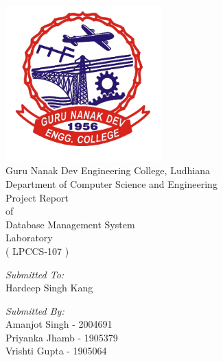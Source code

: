 \begin{titlepage}    
    \begin{center}
        \includegraphics[width=6cm]{figures/gneLogo.png}\\[0.5cm]
        \huge{ Guru Nanak Dev Engineering College, Ludhiana}\\[0.5cm]
        \LARGE{Department of Computer Science and Engineering}\\[2cm]
        \linespread{1.2}\huge {
            Project Report 
            \\of 
            \\Database Management System \\Laboratory\\
            \large{( LPCCS-107 )}
        }
        \linespread{1}~\\[2cm]
        
        \begin{multicols}{2}
            
            {\large 
                \emph{Submitted To:} \\
            }
            {\large 
                Hardeep Singh Kang
            }
            
            \columnbreak
        
            {\large 
                \emph{Submitted By:}\\[0.5cm]
            }
            {\large 
                Amanjot Singh - 2004691\\
                Priyanka Jhamb - 1905379\\
                Vrishti Gupta - 1905064\\[2cm]
            }
            
        \end{multicols}
        \vfill
        \linespread{0.5}~\\[0.5cm]
    \end{center}
\end{titlepage}